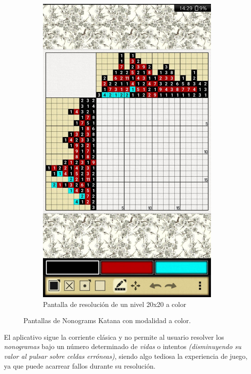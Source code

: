 \documentclass[11pt,spanish,listoffigures,listoftables]{tfgetsinf}
\begin{document}
\begin{figure}[H]
\begin{subfigure}[b]{0.47\linewidth}
   \end{subfigure}
   \begin{subfigure}[b]{0.47\linewidth}
     \includegraphics[width=\linewidth]{images/nonokatana3.jpg}
     \caption{Pantalla de resolución de un nivel 20x20 a color}
     \label{fig:katana2-2}
   \end{subfigure}
   \caption{Pantallas de Nonograms Katana con modalidad a color.}
   \label{fig:katana2}
 \end{figure}
 
 El aplicativo sigue la corriente clásica y no permite al usuario resolver los \textit{nonogramas} bajo un número determinado de \textit{vidas} 
 o intentos \textit{(disminuyendo su valor al pulsar sobre celdas erróneas)}, siendo algo tediosa la experiencia de juego, ya que puede acarrear fallos
 durante su resolución.
\end{document}
